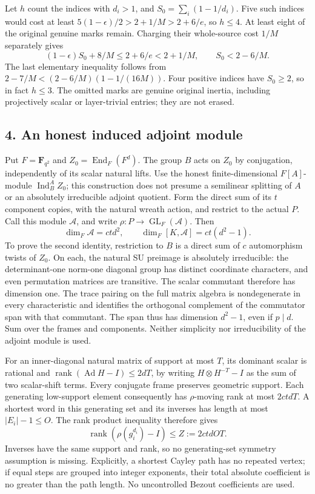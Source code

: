 Let \(h\) count the indices with \(d_i>1\), and
\(S_0=\sum_i(1-1/d_i)\). Five such indices would cost at least
\(5(1-\epsilon)/2>2+1/M>2+6/e\), so \(h\le4\).
At least eight of the original genuine marks remain. Charging their
whole-source cost \(1/M\) separately gives
\[
 (1-\epsilon)S_0+8/M\le2+6/e<2+1/M,
 \qquad S_0<2-6/M.
 \tag{UAR.13}
\]
The last elementary inequality follows from
\(2-7/M<(2-6/M)(1-1/(16M))\).
Four positive indices have \(S_0\ge2\), so in fact \(h\le3\).
The omitted marks are genuine original inertia, including
projectively scalar or layer-trivial entries; they are not erased.

\subsection*{4. An honest induced adjoint module}

Put \(F=\mathbf F_{q^2}\) and \(Z_0=\operatorname{End}_F(F^d)\).
The group \(B\) acts on \(Z_0\) by conjugation, independently of
its scalar natural lifts. Use the honest finite-dimensional
\(F[A]\)-module \(\operatorname{Ind}_B^A Z_0\); this construction
does not presume a semilinear splitting of \(A\) or an absolutely
irreducible adjoint quotient. Form the direct sum of its \(t\)
component copies, with the natural wreath action, and restrict to
the actual \(P\). Call this module \(\mathcal A\), and write
\(\rho:P\to\operatorname{GL}_F(\mathcal A)\). Then
\[
 \dim_F\mathcal A=ctd^2,\qquad
 \dim_F[K,\mathcal A]=ct(d^2-1).
 \tag{UAR.14}
\]
To prove the second identity, restriction to \(B\) is a direct sum
of \(c\) automorphism twists of \(Z_0\). On each, the natural
SU preimage is absolutely irreducible: the determinant-one norm-one
diagonal group has distinct coordinate characters, and even
permutation matrices are transitive. The scalar commutant therefore
has dimension one. The trace pairing on the full matrix algebra is
nondegenerate in every characteristic and identifies the orthogonal
complement of the commutator span with that commutant. The span
thus has dimension \(d^2-1\), even if \(p\mid d\).
Sum over the frames and components. Neither simplicity nor
irreducibility of the adjoint module is used.

For an inner-diagonal natural matrix of support at most \(T\),
its dominant scalar is rational and
\(\operatorname{rank}(\operatorname{Ad}H-I)\le2dT\), by writing
\(H\otimes H^{-T}-I\) as the sum of two scalar-shift terms.
Every conjugate frame preserves geometric support. Each generating
low-support element consequently has \(\rho\)-moving rank at most
\(2ctdT\). A shortest word in this generating set and its inverses
has length at most \(|E_i|-1\le O\). The rank product inequality
therefore gives
\[
         \operatorname{rank}(\rho(g_i^{d_i})-I)
                  \le Z:=2ctdOT.
 \tag{UAR.15}
\]
Inverses have the same support and rank, so no generating-set
symmetry assumption is missing. Explicitly, a shortest Cayley path
has no repeated vertex; if equal steps are grouped into integer
exponents, their total absolute coefficient is no greater than the
path length. No uncontrolled Bezout coefficients are used.

